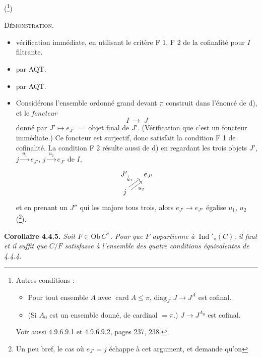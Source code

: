 \documentclass[11pt]{article}
\newcommand{\printedpage}[1]{\if\relax\detokenize{#1}\relax\else\marginpar{\footnotesize p.~#1}\fi}
\newcommand{\Ob}{\mathrm{Ob}\,}
\newcommand{\card}{\operatorname{card}}
\newcommand{\Ind}{\operatorname{Ind}}
\begin{document}
(\footnote{Autres conditions :
\begin{itemize}[leftmargin=3em]
\item[e)] Pour tout ensemble $A$ avec $\card A \leqslant \pi$, $\mathrm{diag}_J : J \longrightarrow J^A$ est cofinal.
\item[e$'$)] (Si $A_0$ est un ensemble donné, de cardinal $= \pi$.) $J \longrightarrow J^{A_0}$ est cofinal.
\end{itemize}
Voir aussi 4.9.6.9.1 et 4.9.6.9.2, pages 237, 238.})

\textsc{Démonstration}.
\begin{itemize}[leftmargin=7em,labelwidth=6em,align=left]
\item[a $\;\Longrightarrow\;$ b] vérification immédiate, en utilisant le critère F 1, F 2 de la cofinalité pour $I$ filtrante.
\item[b $\;\Longrightarrow\;$ c] par AQT.
\item[c $\;\Longrightarrow\;$ d] par AQT.
\end{itemize}

\printedpage{18}
\begin{itemize}[leftmargin=7em,labelwidth=6em,align=left]
\item[d $\;\Longrightarrow\;$ a] Considérons l'ensemble ordonné grand devant $\pi$ construit dans l'énoncé de d), et le \textit{foncteur}
\[
I \;\longrightarrow\; J
\]
donné par $J' \longmapsto e_{J'}$ $=$ objet final de $J'$. (Vérification que c'est un foncteur immédiate.) Ce foncteur est surjectif, donc satisfait la condition F 1 de cofinalité. La condition F 2 résulte aussi de d) en regardant les trois objets $J'$, $j \xrightarrow{\;u_1\;} e_{J'}$, $j \xrightarrow{\;u_2\;} e_{J'}$ de $I$,
\[
\begin{tikzcd}[column sep=small, row sep=small]
J', & e_{J'} \\
j \arrow[ur, shift left, "u_1"] \arrow[ur, shift right, "u_2"'] &
\end{tikzcd}
\]
et en prenant un $J''$ qui les majore tous trois, alors $e_{J'} \longrightarrow e_{J''}$ égalise $u_1$, $u_2$ (\footnote{Un peu bref, le cas où $e_{J'} = j$ échappe à cet argument, et demande qu'on}).
\end{itemize}

\textbf{Corollaire 4.4.5.} \textit{Soit $F \in \Ob C^{\wedge}$. Pour que $F$ appartienne à} $\Ind'_\pi(C)$\textit{, il faut et il suffit que $C/F$ satisfasse à l'ensemble des quatre conditions équivalentes de 4.4.4.}
\end{document}
